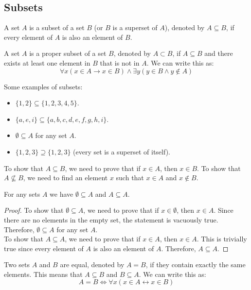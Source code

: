 \subsection{Subsets}
\begin{definition}[Subset]
    A set $A$ is a subset of a set $B$ (or $B$ is a superset of $A$), denoted by $A \subseteq B$, if every element of $A$ is also an element of $B$.
\end{definition}
\begin{definition}
    A set $A$ is a proper subset of a set $B$, denoted by $A \subset B$, if $A \subseteq B$ and there exists at least one element in $B$ that is not in $A$. We can write this as:
    \[ \forall x(x \in A \to x \in B) \land \exists y(y \in B \land y \notin A) \]
\end{definition}

\begin{eg}
    Some examples of subsets:
    \begin{itemize}[itemsep=1pt,label=$\circ$]
        \item $\{1, 2\} \subseteq \{1, 2, 3, 4, 5\}$.
        \item $\{a, e, i\} \subseteq \{a, b, c, d, e, f, g, h, i\}$.
        \item $\emptyset \subseteq A$ for any set $A$.
        \item $\{1, 2, 3\} \supseteq \{1, 2, 3\}$ (every set is a superset of itself).
    \end{itemize}
\end{eg}
To show that $A \subseteq B$, we need to prove that if $x \in A$, then $x \in B$. To show that $A \not\subseteq B$, we need to find an element $x$ such that $x \in A$ and $x \notin B$.
\begin{theorem}
    For any sets $A$ we have $\emptyset \subseteq A$ and $A \subseteq A$.
\end{theorem}
\begin{proof}
    To show that $\emptyset \subseteq A$, we need to prove that if $x \in \emptyset$, then $x \in A$. Since there are no elements in the empty set, the statement is vacuously true. Therefore, $\emptyset \subseteq A$ for any set $A$. \\
    To show that $A \subseteq A$, we need to prove that if $x \in A$, then $x \in A$. This is trivially true since every element of $A$ is also an element of $A$. Therefore, $A \subseteq A$.
\end{proof}

\begin{definition}
    Two sets $A$ and $B$ are equal, denoted by $A = B$, if they contain exactly the same elements. This means that $A \subseteq B$ and $B \subseteq A$. We can write this as:
    \[ A = B \iff \forall x(x \in A \leftrightarrow x \in B) \]
\end{definition}

